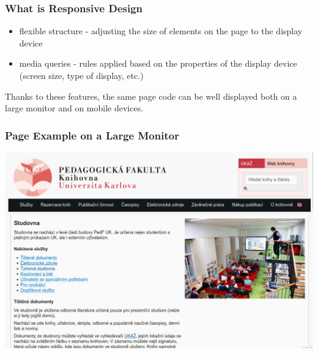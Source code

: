 \ifdefined\HCode
  \long{}
\fi


\begin{frame}
   \frametitle{What is Responsive Design}
   \begin{itemize}
     \item flexible structure - adjusting the size of elements on the page to the display device
     \item media queries - rules applied based on the properties of the display device (screen size, type of display, etc.)
   \end{itemize}

   Thanks to these features, the same page code can be well displayed both on a large monitor and on mobile devices.
\end{frame}

\begin{frame}
  \frametitle{Page Example on a Large Monitor}
  \begin{center}
    \includegraphics[height=.8\textheight]{img/pedf-web-big.png}
  \end{center}
\end{frame}


